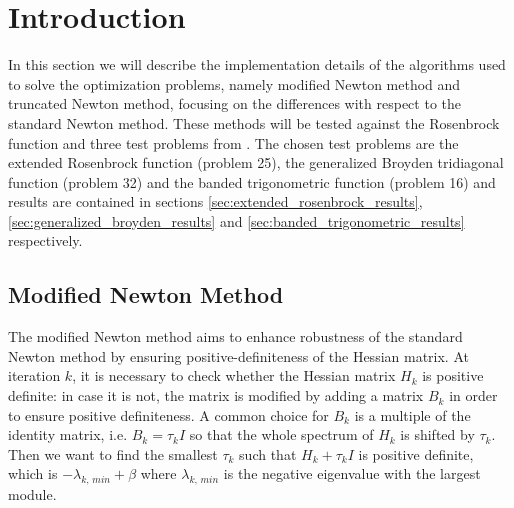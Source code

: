 \section{Introduction}
\label{sec:implementation_details}

In this section we will describe the implementation details of the algorithms used to solve the optimization problems, namely modified Newton method and truncated Newton method, focusing on the differences with respect to the standard Newton method.
These methods will be tested against the Rosenbrock function and three test problems from \cite{test-problems-unconstrained}.
The chosen test problems are the extended Rosenbrock function (problem 25), the generalized Broyden tridiagonal function (problem 32) and the banded trigonometric function (problem 16) and results are contained in sections \ref{sec:extended_rosenbrock_results}, \ref{sec:generalized_broyden_results} and \ref{sec:banded_trigonometric_results} respectively.

\subsection{Modified Newton Method}

The modified Newton method aims to enhance robustness of the standard Newton method by ensuring positive-definiteness of the Hessian matrix.
At iteration $k$, it is necessary to check whether the Hessian matrix $H_k$ is positive definite: in case it is not, the matrix is modified by adding a matrix $B_k$ in order to ensure positive definiteness.
A common choice for $B_k$ is a multiple of the identity matrix, i.e. $B_k = \tau_k I$ so that the whole spectrum of $H_k$ is shifted by $\tau_k$.
Then we want to find the smallest $\tau_k$ such that $H_k + \tau_k I$ is positive definite, which is $-\lambda_{k,\,min} + \beta$ where $\lambda_{k,\,min}$ is the negative eigenvalue with the largest module.

